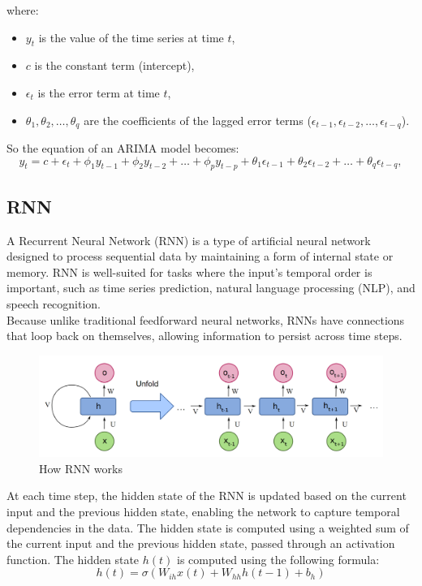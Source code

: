 \documentclass{ieeeojies}
\begin{document}
\begin{itemize}
where:
\begin{itemize}
    \item \( y_t \) is the value of the time series at time \( t \),
    \item \( c \) is the constant term (intercept),
    \item \( \epsilon_t \) is the error term at time \( t \),
    \item \( \theta_1, \theta_2, \ldots, \theta_q \) are the coefficients of the lagged error terms (\( \epsilon_{t-1}, \epsilon_{t-2}, \ldots, \epsilon_{t-q} \)).
\end{itemize}
\end{itemize}
So the equation of an ARIMA model becomes:
\begin{equation}
y_t = c + \epsilon_t + \phi_1 y_{t-1} + \phi_2 y_{t-2} + \ldots + \phi_p y_{t-p} + \theta_1 \epsilon_{t-1} + \theta_2 \epsilon_{t-2} + \ldots + \theta_q \epsilon_{t-q},
\end{equation}

\subsection{RNN}
A Recurrent Neural Network (RNN) is a type of artificial neural network designed to process sequential data by maintaining a form of internal state or memory. RNN is well-suited for tasks where the input's temporal order is important, such as time series prediction, natural language processing (NLP), and speech recognition.\\
Because unlike traditional feedforward neural networks, RNNs have connections that loop back on themselves, allowing information to persist across time steps. 
\begin{figure}
    \centering
    \includegraphics[width=0.5\linewidth]{image-80.png}
    \caption{How RNN works}
    \label{fig:enter-label}
\end{figure}
At each time step, the hidden state of the RNN is updated based on the current input and the previous hidden state, enabling the network to capture temporal dependencies in the data. The hidden state is computed using a weighted sum of the current input and the previous hidden state, passed through an activation function.
The hidden state \( h(t) \) is computed using the following formula:
\begin{equation}
h(t) = \sigma \left( W_{ih} x(t) + W_{hh} h(t-1) + b_h \right)
\end{equation}
\end{document}
